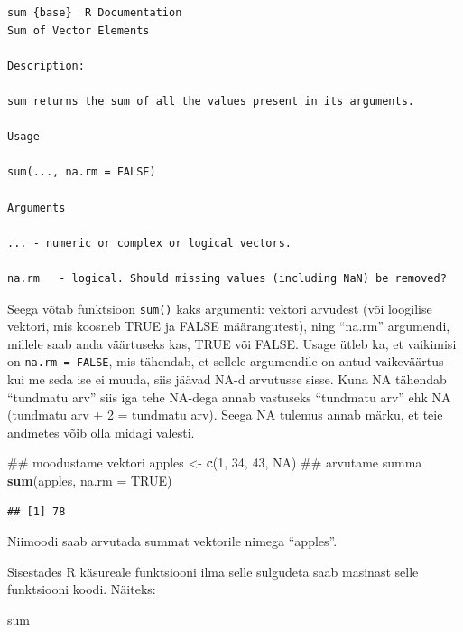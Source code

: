 \documentclass[]{book}
\newenvironment{Shaded}{\begin{snugshade}}{\end{snugshade}}
\newcommand{\KeywordTok}[1]{\textcolor[rgb]{0.13,0.29,0.53}{\textbf{#1}}}
\newcommand{\DataTypeTok}[1]{\textcolor[rgb]{0.13,0.29,0.53}{#1}}
\newcommand{\DecValTok}[1]{\textcolor[rgb]{0.00,0.00,0.81}{#1}}
\newcommand{\StringTok}[1]{\textcolor[rgb]{0.31,0.60,0.02}{#1}}
\newcommand{\OtherTok}[1]{\textcolor[rgb]{0.56,0.35,0.01}{#1}}
\newcommand{\NormalTok}[1]{#1}
\begin{document}
\begin{verbatim}
sum {base}  R Documentation 
Sum of Vector Elements

Description:

sum returns the sum of all the values present in its arguments.

Usage

sum(..., na.rm = FALSE)

Arguments

... - numeric or complex or logical vectors.

na.rm   - logical. Should missing values (including NaN) be removed?
\end{verbatim}

Seega võtab funktsioon \texttt{sum()} kaks argumenti: vektori arvudest
(või loogilise vektori, mis koosneb TRUE ja FALSE määrangutest), ning
``na.rm'' argumendi, millele saab anda väärtuseks kas, TRUE või FALSE.
Usage ütleb ka, et vaikimisi on \texttt{na.rm\ =\ FALSE}, mis tähendab,
et sellele argumendile on antud vaikeväärtus -- kui me seda ise ei
muuda, siis jäävad NA-d arvutusse sisse. Kuna NA tähendab ``tundmatu
arv'' siis iga tehe NA-dega annab vastuseks ``tundmatu arv'' ehk NA
(tundmatu arv + 2 = tundmatu arv). Seega NA tulemus annab märku, et teie
andmetes võib olla midagi valesti.

\begin{Shaded}
\begin{Highlighting}[]
\NormalTok{## moodustame vektori}
\NormalTok{apples <-}\StringTok{ }\KeywordTok{c}\NormalTok{(}\DecValTok{1}\NormalTok{, }\DecValTok{34}\NormalTok{, }\DecValTok{43}\NormalTok{, }\OtherTok{NA}\NormalTok{)}
\NormalTok{## arvutame summa}
\KeywordTok{sum}\NormalTok{(apples, }\DataTypeTok{na.rm =} \OtherTok{TRUE}\NormalTok{)}
\end{Highlighting}
\end{Shaded}

\begin{verbatim}
## [1] 78
\end{verbatim}

Niimoodi saab arvutada summat vektorile nimega ``apples''.

Sisestades R käsureale funktsiooni ilma selle sulgudeta saab masinast
selle funktsiooni koodi. Näiteks:

\begin{Shaded}
\begin{Highlighting}[]
\NormalTok{sum}
\end{Highlighting}
\end{Shaded}
\end{document}
